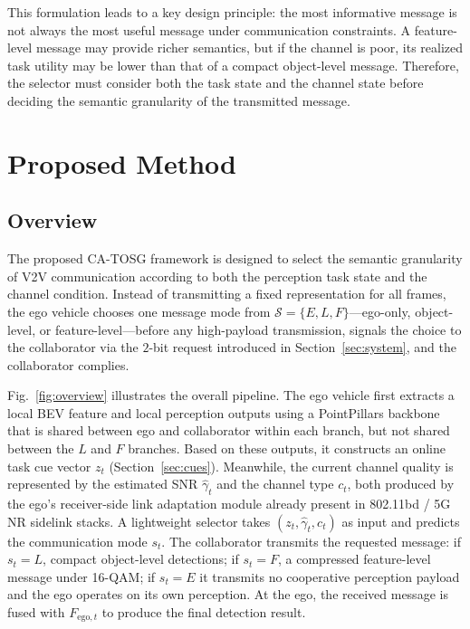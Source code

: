 \documentclass[journal]{IEEEtran}
\newcommand{\method}{CA-TOSG}
\begin{document}
This formulation leads to a key design principle: the most informative message is not always the most useful message under communication constraints. A feature-level message may provide richer semantics, but if the channel is poor, its realized task utility may be lower than that of a compact object-level message. Therefore, the selector must consider both the task state and the channel state before deciding the semantic granularity of the transmitted message.

\section{Proposed Method}\label{sec:method}

\subsection{Overview}

The proposed \method{} framework is designed to select the semantic granularity of V2V communication according to both the perception task state and the channel condition. Instead of transmitting a fixed representation for all frames, the ego vehicle chooses one message mode from $\mathcal{S}=\{E,L,F\}$---ego-only, object-level, or feature-level---before any high-payload transmission, signals the choice to the collaborator via the $2$-bit request introduced in Section~\ref{sec:system}, and the collaborator complies.

Fig.~\ref{fig:overview} illustrates the overall pipeline. The ego vehicle first extracts a local BEV feature and local perception outputs using a PointPillars backbone~\cite{lang2019pointpillars} that is shared between ego and collaborator within each branch, but not shared between the $L$ and $F$ branches. Based on these outputs, it constructs an online task cue vector $z_t$ (Section~\ref{sec:cues}). Meanwhile, the current channel quality is represented by the estimated SNR $\hat\gamma_t$ and the channel type $c_t$, both produced by the ego's receiver-side link adaptation module already present in 802.11bd / 5G NR sidelink stacks. A lightweight selector takes $(z_t,\hat\gamma_t,c_t)$ as input and predicts the communication mode $s_t$. The collaborator transmits the requested message: if $s_t=L$, compact object-level detections; if $s_t=F$, a compressed feature-level message under 16-QAM; if $s_t=E$ it transmits no cooperative perception payload and the ego operates on its own perception. At the ego, the received message is fused with $F_{\mathrm{ego},t}$ to produce the final detection result.
\end{document}

